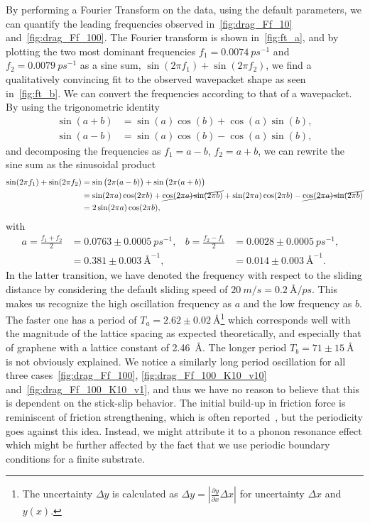 By performing a Fourier Transform on the data, using the default parameters, we can quantify the leading frequencies observed in~\cref{fig:drag_Ff_10} and~\cref{fig:drag_Ff_100}. The Fourier transform is shown in~\cref{fig:ft_a}, and by plotting the two most dominant frequencies $f_1 = \SI{0.0074}{ps^{-1}}$ and $f_2 = \SI{0.0079}{ps^{-1}}$ as a sine sum, $\sin{(2\pi f_1)} + \sin{(2\pi f_2)}$, we find a qualitatively convincing fit to the observed wavepacket shape as seen in~\cref{fig:ft_b}. We can convert the frequencies according to that of a wavepacket. By using the trigonometric identity
\begin{align*}
\sin (a+b) &= \sin (a) \cos (b) + \cos (a) \sin (b), \\
\sin (a-b) &= \sin (a) \cos (b) - \cos (a) \sin (b),
\end{align*}
and decomposing the frequencies as $f_1 = a - b$, $f_2 = a + b$, we can rewrite the sine sum as the sinusoidal product
\begin{align*}
  \sin(2\pi f_1) + \sin(2\pi f_2) &= \sin\big(2\pi (a - b)\big) + \sin\big(2\pi (a + b)\big) \\
  &= \sin(2\pi a)\cos(2\pi b) + \cancel{\cos(2\pi a)\sin(2\pi b)} + \sin(2\pi a)\cos(2\pi b) - \cancel{\cos(2\pi a)\sin(2\pi b)} \\
  &= 2 \sin(2\pi a) \cos(2\pi b),
\end{align*} 
with 
\begin{align*}
  a = \frac{f_1 + f_2}{2} &= 0.0763 \pm \SI{0.0005}{ps^{-1}},& 
  b = \frac{f_2 - f_1}{2} &= 0.0028 \pm \SI{0.0005}{ps^{-1}},& \\
  &= 0.381 \pm \SI{0.003}{{\text{Å}}^{-1}},& 
  &= 0.014 \pm \SI{0.003}{{\text{Å}}^{-1}}.& 
\end{align*}
In the latter transition, we have denoted the frequency with respect to the sliding distance by considering the default sliding speed of $\SI{20}{m/s} = \SI{0.2}{\text{Å}/ps}$. This makes us recognize the high oscillation frequency as $a$ and the low frequency
as $b$. The faster one has a period of $T_a = 2.62 \pm \SI{0.02}{\text{Å}}$\footnote{The
uncertainty $\Delta y$ is calculated as $\Delta y = \left|\frac{\partial
y}{\partial x} \Delta x \right|$ for uncertainty $\Delta x$ and $y(x)$.} which
corresponds well with the magnitude of the lattice spacing as expected theoretically, and especially that of
graphene with a lattice constant of \SI{2.46}{Å}. The longer period $T_b = 71 \pm
\SI{15}{\text{Å}}$ is not obviously explained. We notice a similarly long period oscillation for all three cases~\cref{fig:drag_Ff_100}, \cref{fig:drag_Ff_100_K10_v10} and~\cref{fig:drag_Ff_100_K10_v1}, and thus we have no reason to believe that this is dependent on the stick-slip behavior. The initial build-up in friction force is reminiscent of friction strengthening, which is often reported~\cite{zhang_tuning_2019, li_evolving_2016}, but the periodicity goes against this idea. Instead, we might attribute it to a phonon
resonance effect which might be further affected by the fact that we use periodic boundary conditions for a finite substrate.

